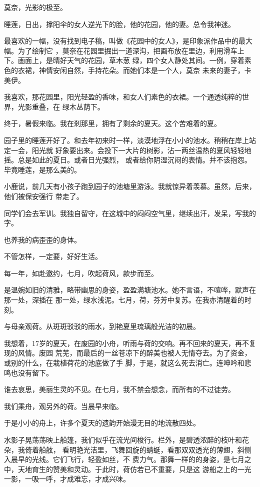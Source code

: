 \documentclass[12pt,a4paper]{article}
\begin{document}
		莫奈，光影的极至。\par
		睡莲，日出，撑阳伞的女人逆光下的脸，他的花园，他的妻。总令我神迷。

		最喜欢的一幅，没有找到电子稿，叫做《花园中的女人》，是印象派作品中的最大幅。为了绘制它
	，莫奈在花园里掘出一道深沟，把画布放在里边，利用滑车上下。画面上，是晴好天气的花园，草木葱
	绿，四个女人静处其间。一例，穿着素色的衣裙，神情安闲自然，手持花朵。而她们本是一个人，莫奈
	未来的妻子，卡美伊。

		我喜欢，那花园里，阳光轻盈的香味，和女人们素色的衣裙。一个通透纯粹的世界，光影重叠，在
	绿木丛荫下。

		终于，暑假来临。我在刹那里，拥有了剩余的夏天。这个苦难着的夏。

		园子里的睡莲开好了。和去年初来时一样，淡漠地浮在小小的池水。稍稍在岸上站定一会，阳光就
	好象要出来。会投下一大片的树影，沾一两丝温热的夏风轻轻地摇。总是如此的夏日。或者日光强烈，
	或者给你阴湿沉闷的表情。并不该抱怨。毕竟睡莲，是那么美的。

		小鹿说，前几天有小孩子跑到园子的池塘里游泳。我就惊异着羡慕。虽然，后来，他们被保安强行
	带走了。

		同学们会去军训。我独自留守，在这城中的闷闷空气里，继续出汗，发呆，写我的字。\par
		也养我的病歪歪的身体。\par
		不管怎样，一定要，好好生活。

	\endwriting



		每一年，如赴邀约，七月，吹起荷风，款步而至。

		是温婉如旧的清雅，略带幽思的身姿，盈盈满塘池水。她不言语，不喧哗，默声在那一处，深插在
	那一处，绿水浅泥。七月，荷，芬芳中复苏。在我亦清醒着的时刻。

		与母亲观荷。从斑斑驳驳的雨水，到艳夏里琉璃般光洁的初晨。

		我想着，17岁的夏天，在废园的小舟，听雨与荷的交响。再不回来的夏天，再不复现的风情。废园
	荒芜，而最后的一丝苍凉下的醉美也被人无情夺去。为了资金，或别的什么，在栽植荷花的池底做了手
	脚，于是，就这么死去消亡。连呻吟和悲鸣也没有留下。

		谁去哀思，美丽生灵的不见。在七月，我不禁会想念，而所有的不过徒劳。\par
		我们乘舟，观另外的荷。当晨早来临。\par
		于是小小的舟上，许多个夏天的遗韵开始漫无目的地流散四处。

		水影子晃荡荡映上船篷，我们似乎在流光间梭行。栏外，是碧透浓醉的枝叶和花朵，我倚着船舷，
	看明艳光洁里，飞舞回旋的蜻蜓，看那双双透光的薄翅，斜侧入晨早的光线。它们飞行，轻盈如丝，不
	费力气。那舞一样的的身姿，是七月之中，天地育生的赞美和灵动。于此时，荷仿若已不重要，只是这
	游船之上的一光一影，一吸一呼，才成难忘，才成兴味。
\end{document}

